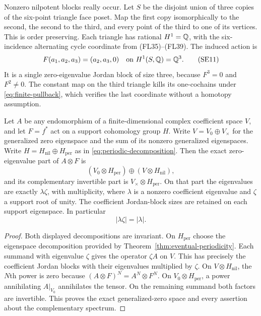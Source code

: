 Nonzero nilpotent blocks really occur. Let $S$ be the disjoint union
of three copies of the six-point triangle face poset. Map the first
copy isomorphically to the second, the second to the third, and every
point of the third to one of its vertices. This is order preserving.
Each triangle has rational $H^1=\mathbb Q$, with the six-incidence alternating
cycle coordinate from (FL35)--(FL39). The induced action is
\[
 F(a_1,a_2,a_3)=(a_2,a_3,0)
 \quad\text{on }H^1(S,\mathbb Q)=\mathbb Q^3.
 \tag{SE11}\label{eq:nilpotent-example}
\]
It is a single zero-eigenvalue Jordan block of size three, because
$F^3=0$ and $F^2\ne0$. The constant map on the third triangle kills
its one-cochains under \eqref{eq:finite-pullback}, which verifies
the last coordinate without a homotopy assumption.

\begin{theorem}
\label{thm:combined-spectrum}
Let $A$ be any endomorphism of a finite-dimensional complex coefficient
space $V$, and let $F=f^*$ act on a support cohomology group $H$.
Write $V=V_0\oplus V_\times$ for the generalized zero eigenspace and
the sum of its nonzero generalized eigenspaces. Write
$H=H_{\mathrm{nil}}\oplus H_{\mathrm{per}}$ as in
\eqref{eq:periodic-decomposition}. Then the exact zero-eigenvalue
part of $A\otimes F$ is
\[
 (V_0\otimes H_{\mathrm{per}})\oplus(V\otimes H_{\mathrm{nil}}),
 \tag{SE12}\label{eq:combined-zero}
\]
and its complementary invertible part is
$V_\times\otimes H_{\mathrm{per}}$. On that part the eigenvalues
are exactly $\lambda\zeta$, with multiplicity, where $\lambda$ is
a nonzero coefficient eigenvalue and $\zeta$ a support root of unity.
The coefficient Jordan-block sizes are retained on each support
eigenspace. In particular
\[
 |\lambda\zeta|=|\lambda|.
 \tag{SE13}\label{eq:modulus-comparison}
\]
\end{theorem}
\begin{proof}
Both displayed decompositions are invariant. On $H_{\mathrm{per}}$
choose the eigenspace decomposition provided by
Theorem~\ref{thm:eventual-periodicity}. Each summand with eigenvalue
$\zeta$ gives the operator $\zeta A$ on $V$. This has precisely the
coefficient Jordan blocks with their eigenvalues multiplied by
$\zeta$. On $V\otimes H_{\mathrm{nil}}$, the $N$th power is zero
because $(A\otimes F)^N=A^N\otimes F^N$. On
$V_0\otimes H_{\mathrm{per}}$, a power annihilating $A|_{V_0}$
annihilates the tensor. On the remaining summand both factors are
invertible. This proves the exact generalized-zero space and every
assertion about the complementary spectrum.
\end{proof}


